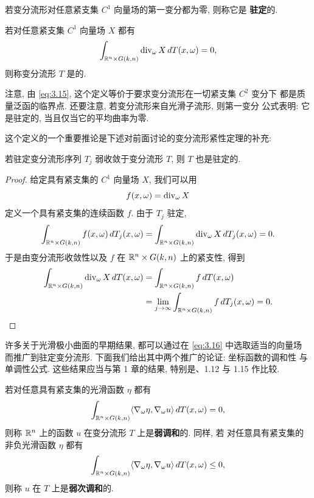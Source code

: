 若变分流形对任意紧支集 $C^1$ 向量场的第一变分都为零, 则称它是
\textbf{驻定}的.

\begin{definition}
\label{def:3.4}
若对任意紧支集 $C^1$ 向量场 $X$ 都有
\begin{equation}
\int_{\mathbb{R}^n\times G(k,n)}\operatorname{div}_\omega X\,dT(x,\omega)=0,
\label{eq:3.16}
\end{equation}
则称变分流形 $T$ 是的.
\end{definition}

注意, 由 \eqref{eq:3.15}, 这个定义等价于要求变分流形在一切紧支集 $C^2$ 变分下
都是质量泛函的临界点. 还要注意, 若变分流形来自光滑子流形, 则第一变分
公式表明: 它是驻定的, 当且仅当它的平均曲率为零.

这个定义的一个重要推论是下述对前面讨论的变分流形紧性定理的补充:

\begin{proposition}
\label{prop:3.5}
若驻定变分流形序列 $T_j$ 弱收敛于变分流形 $T$, 则 $T$ 也是驻定的.
\end{proposition}

\begin{proof}
给定具有紧支集的 $C^1$ 向量场 $X$, 我们可以用
\begin{equation}
f(x,\omega)=\operatorname{div}_\omega X
\label{eq:3.17}
\end{equation}
定义一个具有紧支集的连续函数 $f$. 由于 $T_j$ 驻定,
\begin{equation}
\int_{\mathbb{R}^n\times G(k,n)}f(x,\omega)\,dT_j(x,\omega)
 =\int_{\mathbb{R}^n\times G(k,n)}\operatorname{div}_\omega X\,dT_j(x,\omega)=0.
\label{eq:3.18}
\end{equation}
于是由变分流形收敛性以及 $f$ 在 $\mathbb{R}^n\times G(k,n)$ 上的紧支性, 得到
\begin{equation}
\begin{aligned}
\int_{\mathbb{R}^n\times G(k,n)}\operatorname{div}_\omega X\,dT(x,\omega)
&=\int_{\mathbb{R}^n\times G(k,n)}f\,dT(x,\omega)\\
&=\lim_{j\to\infty}\int_{\mathbb{R}^n\times G(k,n)}f\,dT_j(x,\omega)=0.
\end{aligned}
\label{eq:3.19}
\end{equation}
\end{proof}

许多关于光滑极小曲面的早期结果, 都可以通过在 \eqref{eq:3.16} 中选取适当的向量场
而推广到驻定变分流形. 下面我们给出其中两个推广的论证: 坐标函数的调和性
与单调性公式. 这些结果应当与第 1 章的结果, 特别是、1.12 与 1.15
作比较.

若对任意具有紧支集的光滑函数 $\eta$ 都有
\begin{equation}
\int_{\mathbb{R}^n\times G(k,n)}\langle\nabla_\omega\eta,\nabla_\omega u\rangle
 \,dT(x,\omega)=0,
\label{eq:3.20}
\end{equation}
则称 $\mathbb{R}^n$ 上的函数 $u$ 在变分流形 $T$ 上是\textbf{弱调和}的. 同样, 若
对任意具有紧支集的非负光滑函数 $\eta$ 都有
\begin{equation}
\int_{\mathbb{R}^n\times G(k,n)}\langle\nabla_\omega\eta,\nabla_\omega u\rangle
 \,dT(x,\omega)\leq0,
\label{eq:3.21}
\end{equation}
则称 $u$ 在 $T$ 上是\textbf{弱次调和}的.

